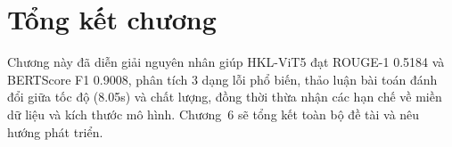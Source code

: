 \section{Tổng kết chương}

Chương này đã diễn giải nguyên nhân giúp HKL-ViT5 đạt ROUGE-1 0.5184 và BERTScore F1 0.9008, phân tích 3 dạng lỗi phổ biến, thảo luận bài toán đánh đổi giữa tốc độ (8.05s) và chất lượng, đồng thời thừa nhận các hạn chế về miền dữ liệu và kích thước mô hình. Chương~6 sẽ tổng kết toàn bộ đề tài và nêu hướng phát triển.
